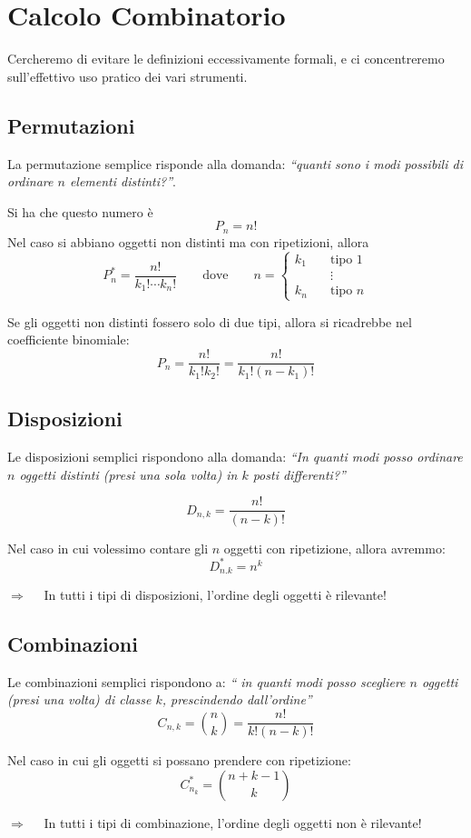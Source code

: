 \section{Calcolo Combinatorio}

Cercheremo di evitare le definizioni eccessivamente formali, e ci concentreremo sull'effettivo uso pratico dei vari strumenti.

\subsection{Permutazioni}

La permutazione semplice risponde alla domanda: \textit{``quanti sono i modi possibili di ordinare $n$ elementi distinti?''}.

\medskip
\noindent Si ha che questo numero è
\[\boxed{P_n = n!}\] 
Nel caso si abbiano oggetti non distinti ma con ripetizioni, allora
\[\boxed{P_n^* = \frac{n!}{k_1!\cdots k_n!}}\qquad \text{dove}\qquad n = \begin{cases}
    k_1\quad &\text{tipo }1\\
    &\vdots\\
    k_n\quad &\text{tipo }n
\end{cases}\]

\noindent Se gli oggetti non distinti fossero solo di due tipi, allora si ricadrebbe nel coefficiente binomiale:
\[P_n = \frac{n!}{k_1!k_2!} = \frac{n!}{k_1!(n-k_1)!}\]

\subsection{Disposizioni}
Le disposizioni semplici rispondono alla domanda: \textit{``In quanti modi posso ordinare $n$ oggetti distinti (presi una sola volta) in $k$ posti differenti?''}

\[\boxed{D_{n, k} = \frac{n!}{(n-k)!}}\]

\noindent Nel caso in cui volessimo contare gli $n$ oggetti con ripetizione, allora avremmo:
\[\boxed{D_{n. k}^* = n^k}\]

$\Rightarrow \quad$ In tutti i tipi di disposizioni, l'ordine degli oggetti è rilevante!

\subsection{Combinazioni}

Le combinazioni semplici rispondono a: \textit{`` in quanti modi posso scegliere $n$ oggetti (presi una volta) di classe $k$, prescindendo dall'ordine''}
\[\boxed{C_{n, k} = \binom{n}{k} = \frac{n!}{k!(n-k)!}}\]

\noindent Nel caso in cui gli oggetti si possano prendere con ripetizione:
\[\boxed{C_{n_k}^* = \binom{n+k-1}{k}}\]

$\Rightarrow \quad$ In tutti i tipi di combinazione, l'ordine degli oggetti non è rilevante!